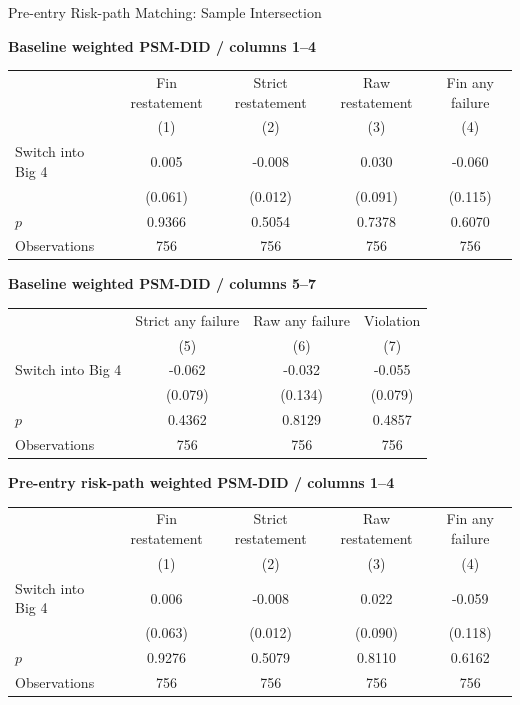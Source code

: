 \documentclass[10pt]{article}
\begin{document}
\fontsize{10}{12}\selectfont
\setlength{\tabcolsep}{3pt}\renewcommand{\arraystretch}{1.15}
\begin{center}\large Pre-entry Risk-path Matching: Sample Intersection\end{center}
\medskip\textbf{Baseline weighted PSM-DID / columns 1--4}\par\smallskip
\begin{tabular*}{\textwidth}{@{\extracolsep{\fill}}lcccc@{}}
\toprule
 & Fin restatement & Strict restatement & Raw restatement & Fin any failure \\
 & (1) & (2) & (3) & (4) \\
\midrule
Switch into Big 4 & 0.005 & -0.008 & 0.030 & -0.060 \\
 & (0.061) & (0.012) & (0.091) & (0.115) \\
$p$ & 0.9366 & 0.5054 & 0.7378 & 0.6070 \\
Observations & 756 & 756 & 756 & 756 \\
\bottomrule\end{tabular*}\par
\medskip\textbf{Baseline weighted PSM-DID / columns 5--7}\par\smallskip
\begin{tabular*}{\textwidth}{@{\extracolsep{\fill}}lccc@{}}
\toprule
 & Strict any failure & Raw any failure & Violation \\
 & (5) & (6) & (7) \\
\midrule
Switch into Big 4 & -0.062 & -0.032 & -0.055 \\
 & (0.079) & (0.134) & (0.079) \\
$p$ & 0.4362 & 0.8129 & 0.4857 \\
Observations & 756 & 756 & 756 \\
\bottomrule\end{tabular*}\par
\medskip\textbf{Pre-entry risk-path weighted PSM-DID / columns 1--4}\par\smallskip
\begin{tabular*}{\textwidth}{@{\extracolsep{\fill}}lcccc@{}}
\toprule
 & Fin restatement & Strict restatement & Raw restatement & Fin any failure \\
 & (1) & (2) & (3) & (4) \\
\midrule
Switch into Big 4 & 0.006 & -0.008 & 0.022 & -0.059 \\
 & (0.063) & (0.012) & (0.090) & (0.118) \\
$p$ & 0.9276 & 0.5079 & 0.8110 & 0.6162 \\
Observations & 756 & 756 & 756 & 756 \\
\bottomrule\end{tabular*}\par
\end{document}
